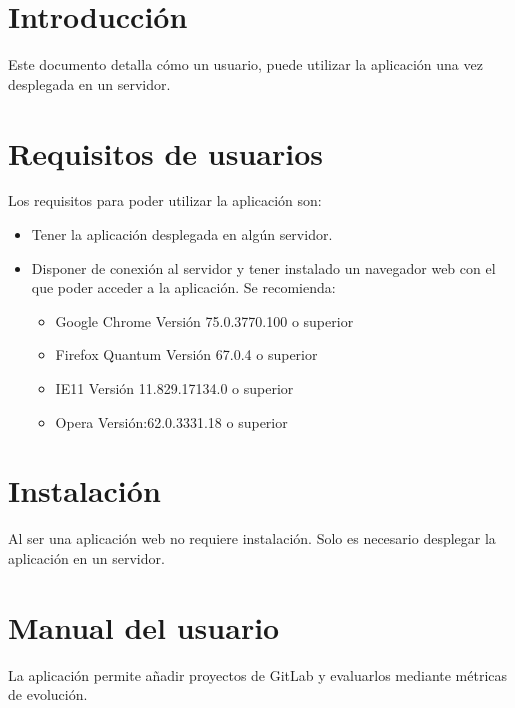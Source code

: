 
\section{Introducción}
Este documento detalla cómo un usuario, puede utilizar la aplicación una vez desplegada en un servidor.
\section{Requisitos de usuarios}
Los requisitos para poder utilizar la aplicación son:
\begin{itemize}
	\tightlist
	\item Tener la aplicación desplegada en algún servidor.
	\item Disponer de conexión al servidor y tener instalado un navegador web con el que poder acceder a la aplicación. Se recomienda:
	\begin{itemize}
		\tightlist
		\item Google Chrome Versión 75.0.3770.100 o superior
		\item Firefox Quantum Versión 67.0.4 o superior
		\item IE11 Versión 11.829.17134.0 o superior
		\item Opera Versión:62.0.3331.18 o superior
	\end{itemize}
\end{itemize}
\section{Instalación}
Al ser una aplicación web no requiere instalación. Solo es necesario desplegar la aplicación en un servidor.
\section{Manual del usuario}
La aplicación permite añadir proyectos de GitLab y evaluarlos mediante métricas de evolución.\\
